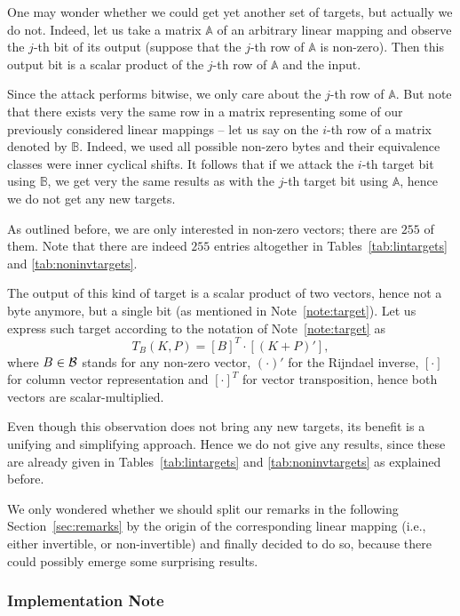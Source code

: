 One may wonder whether we could get yet another set of targets, but actually we do not. Indeed, let us take a matrix $\mathbb{A}$ of an arbitrary linear mapping and observe the $j$-th bit of its output (suppose that the $j$-th row of $\mathbb{A}$ is non-zero). Then this output bit is a scalar product of the $j$-th row of $\mathbb{A}$ and the input.

Since the attack performs bitwise, we only care about the $j$-th row of $\mathbb{A}$. But note that there exists very the same row in a matrix representing some of our previously considered linear mappings -- let us say on the $i$-th row of a matrix denoted by $\mathbb{B}$. Indeed, we used all possible non-zero bytes and their equivalence classes were inner cyclical shifts. It follows that if we attack the $i$-th target bit using $\mathbb{B}$, we get very the same results as with the $j$-th target bit using $\mathbb{A}$, hence we do not get any new targets.

As outlined before, we are only interested in non-zero vectors; there are $255$ of them. Note that there are indeed $255$ entries altogether in Tables~\ref{tab:lintargets} and \ref{tab:noninvtargets}.

The output of this kind of target is a scalar product of two vectors, hence not a byte anymore, but a single bit (as mentioned in Note~\ref{note:target}). Let us express such target according to the notation of Note~\ref{note:target} as
\begin{equation}
\label{eq:tba}
	T_B(K,P) = [B]^T\cdot [(K+P)'] ,
\end{equation}
where $B\in\cal B$ stands for any non-zero vector, $(\cdot)'$ for the Rijndael inverse, $[\cdot]$ for column vector representation and $[\cdot]^T$ for vector transposition, hence both vectors are scalar-multiplied.

Even though this observation does not bring any new targets, its benefit is a unifying and simplifying approach. Hence we do not give any results, since these are already given in Tables~\ref{tab:lintargets} and \ref{tab:noninvtargets} as explained before.

We only wondered whether we should split our remarks in the following Section~\ref{sec:remarks} by the origin of the corresponding linear mapping (i.e., either invertible, or non-invertible) and finally decided to do so, because there could possibly emerge some surprising results.

\subsubsection{Implementation Note}
	
